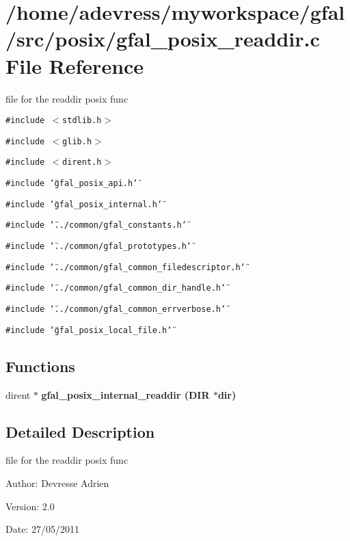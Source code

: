 \section{/home/adevress/myworkspace/gfal/src/posix/gfal\_\-posix\_\-readdir.c File Reference}
\label{gfal__posix__readdir_8c}
file for the readdir posix func 

{\tt \#include $<$stdlib.h$>$}\par
{\tt \#include $<$glib.h$>$}\par
{\tt \#include $<$dirent.h$>$}\par
{\tt \#include \char`\"{}gfal\_\-posix\_\-api.h\char`\"{}}\par
{\tt \#include \char`\"{}gfal\_\-posix\_\-internal.h\char`\"{}}\par
{\tt \#include \char`\"{}../common/gfal\_\-constants.h\char`\"{}}\par
{\tt \#include \char`\"{}../common/gfal\_\-prototypes.h\char`\"{}}\par
{\tt \#include \char`\"{}../common/gfal\_\-common\_\-filedescriptor.h\char`\"{}}\par
{\tt \#include \char`\"{}../common/gfal\_\-common\_\-dir\_\-handle.h\char`\"{}}\par
{\tt \#include \char`\"{}../common/gfal\_\-common\_\-errverbose.h\char`\"{}}\par
{\tt \#include \char`\"{}gfal\_\-posix\_\-local\_\-file.h\char`\"{}}\par
\subsection*{Functions}
\begin{CompactItemize}
\item 
dirent $\ast$ \bf{gfal\_\-posix\_\-internal\_\-readdir} (DIR $\ast$dir)
\end{CompactItemize}


\subsection{Detailed Description}
file for the readdir posix func 

\begin{Desc}
\item[Author:]Devresse Adrien \end{Desc}
\begin{Desc}
\item[Version:]2.0 \end{Desc}
\begin{Desc}
\item[Date:]27/05/2011 \end{Desc}


